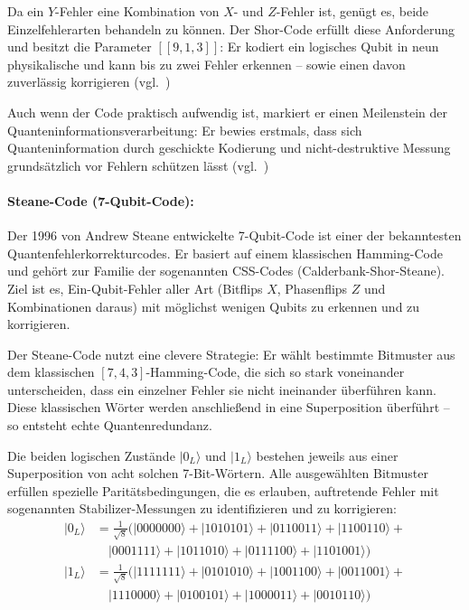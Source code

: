 Da ein \(Y\)-Fehler eine Kombination von \(X\)- und \(Z\)-Fehler ist, genügt es, beide Einzelfehlerarten behandeln zu können. Der Shor-Code erfüllt diese Anforderung und besitzt die Parameter \([[9, 1, 3]]\): Er kodiert ein logisches Qubit in neun physikalische und kann bis zu zwei Fehler erkennen – sowie einen davon zuverlässig korrigieren (vgl.~\cite[10-11]{devitt_quantum_2013})

Auch wenn der Code praktisch aufwendig ist, markiert er einen Meilenstein der Quanteninformationsverarbeitung: Er bewies erstmals, dass sich Quanteninformation durch geschickte Kodierung und nicht-destruktive Messung grundsätzlich vor Fehlern schützen lässt (vgl.~\cite[Seite 432–434]{nielsen_quantum_2010})
\medskip
\paragraph{Steane-Code (7-Qubit-Code):}

Der 1996 von Andrew Steane entwickelte 7-Qubit-Code ist einer der bekanntesten Quantenfehlerkorrekturcodes. Er basiert auf einem klassischen Hamming-Code und gehört zur Familie der sogenannten CSS-Codes (Calderbank-Shor-Steane). Ziel ist es, Ein-Qubit-Fehler aller Art (Bitflips \(X\), Phasenflips \(Z\) und Kombinationen daraus) mit möglichst wenigen Qubits zu erkennen und zu korrigieren.

Der Steane-Code nutzt eine clevere Strategie: Er wählt bestimmte Bitmuster aus dem klassischen \([7,4,3]\)-Hamming-Code, die sich so stark voneinander unterscheiden, dass ein einzelner Fehler sie nicht ineinander überführen kann. Diese klassischen Wörter werden anschließend in eine Superposition überführt – so entsteht echte Quantenredundanz.

Die beiden logischen Zustände \(|0_L\rangle\) und \(|1_L\rangle\) bestehen jeweils aus einer Superposition von acht solchen 7-Bit-Wörtern. Alle ausgewählten Bitmuster erfüllen spezielle Paritätsbedingungen, die es erlauben, auftretende Fehler mit sogenannten Stabilizer-Messungen zu identifizieren und zu korrigieren:
\[
\begin{aligned}
|0_L\rangle &= \frac{1}{\sqrt{8}} \big( 
|0000000\rangle + |1010101\rangle + |0110011\rangle + |1100110\rangle + {} \\
&\quad |0001111\rangle + |1011010\rangle + |0111100\rangle + |1101001\rangle \big) \\
|1_L\rangle &= \frac{1}{\sqrt{8}} \big( 
|1111111\rangle + |0101010\rangle + |1001100\rangle + |0011001\rangle + {} \\
&\quad |1110000\rangle + |0100101\rangle + |1000011\rangle + |0010110\rangle \big)
\end{aligned}
\]

